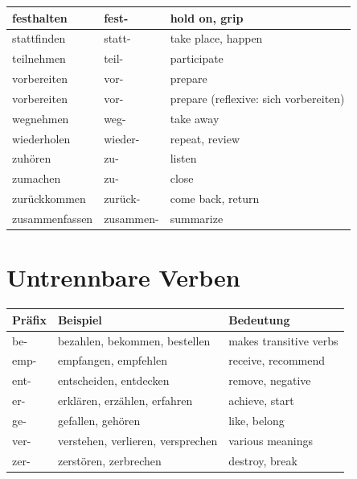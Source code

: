 \begin{center}
\begin{tabular}{|l|l|p{6cm}|}
festhalten & fest- & hold on, grip \\ \hline
stattfinden & statt- & take place, happen \\ \hline
teilnehmen & teil- & participate \\ \hline
vorbereiten & vor- & prepare \\ \hline
vorbereiten & vor- & prepare (reflexive: sich vorbereiten) \\ \hline
wegnehmen & weg- & take away \\ \hline
wiederholen & wieder- & repeat, review \\ \hline
zuhören & zu- & listen \\ \hline
zumachen & zu- & close \\ \hline
zurückkommen & zurück- & come back, return \\ \hline
zusammenfassen & zusammen- & summarize \\ \hline
\end{tabular}
\end{center}

\section{Untrennbare Verben}
\label{sec:Untrennbar}

\bigskip
\begin{center}
\begin{tabular}{|l|l|p{6cm}|}
\hline
Präfix & Beispiel & Bedeutung \\ \hline
be- & \begin{minipage}{6cm}bezahlen, bekommen, bestellen\end{minipage} & makes transitive verbs \\ \hline
emp- & \begin{minipage}{6cm}empfangen, empfehlen\end{minipage} & receive, recommend \\ \hline
ent- & \begin{minipage}{6cm}entscheiden, entdecken\end{minipage} & remove, negative \\ \hline
er- & \begin{minipage}{6cm}erklären, erzählen, erfahren\end{minipage} & achieve, start \\ \hline
ge- & \begin{minipage}{6cm}gefallen, gehören\end{minipage} & like, belong \\ \hline
ver- & \begin{minipage}{6cm}verstehen, verlieren, versprechen\end{minipage} & various meanings \\ \hline
zer- & \begin{minipage}{6cm}zerstören, zerbrechen\end{minipage} & destroy, break \\ \hline
\end{tabular}
\end{center}

